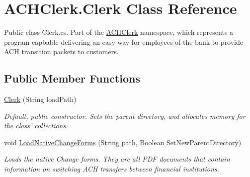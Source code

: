 \hypertarget{class_a_c_h_clerk_1_1_clerk}{\section{A\+C\+H\+Clerk.\+Clerk Class Reference}
\label{class_a_c_h_clerk_1_1_clerk}
}


Public class Clerk.\+cs. Part of the \hyperlink{namespace_a_c_h_clerk}{A\+C\+H\+Clerk} namespace, which represents a program capbable delivering an easy way for employees of the bank to provide A\+C\+H transition packets to customers.  


\subsection*{Public Member Functions}
\begin{DoxyCompactItemize}
\item 
\hyperlink{class_a_c_h_clerk_1_1_clerk_ac06ec127e87e71de32d5b9290a6e3a81}{Clerk} (String load\+Path)
\begin{DoxyCompactList}\small\item\em Default, public constructor. Sets the parent directory, and allocates memory for the class' collections. \end{DoxyCompactList}\item 
void \hyperlink{class_a_c_h_clerk_1_1_clerk_a8448ab55cbb9a45181a8edb101fa9e95}{Load\+Native\+Change\+Forms} (String path, Boolean Set\+New\+Parent\+Directory)
\begin{DoxyCompactList}\small\item\em Loads the native Change forms. They are all P\+D\+F documents that contain information on switching A\+C\+H transfers between financial institutions. \end{DoxyCompactList}\end{DoxyCompactItemize}
